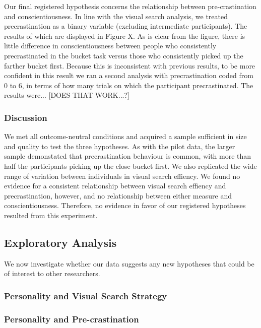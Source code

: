 \documentclass[]{rsos}
\begin{document}
Our final registered hypothesis concerns the relationship between pre-crastination and conscientiousness. In line with the visual search analysis, we treated precrastination as a binary variable (excluding intermediate participants). The results of which are displayed in Figure X. As is clear from the figure, there is little difference in conscientiousness between people who consistently precrastinated in the bucket task versus those who consistently picked up the farther bucket first. Because this is inconsistent with previous results, to be more confident in this result we ran a second analysis with precrastination coded from 0 to 6, in terms of how many trials on which the participant precrastinated. The results were...  [DOES THAT WORK...?]


\subsubsection{Discussion}

We met all outcome-neutral conditions and acquired a sample sufficient in size and quality to test the three hypotheses. As with the pilot data, the larger sample demonstated that precrastination behaviour is common, with more than half the participants picking up the close bucket first. We also replicated the wide range of variation between individuals in visual search effiency. We found no evidence for a consistent relationship between visual search effiency and precrastination, however, and no relationship between either measure and conscientiousness. Therefore, no evidence in favor of our registered hypotheses resulted from this experiment. 

\subsection{Exploratory Analysis}

We now investigate whether our data suggests any new hypotheses that could be of interest to other researchers.

\subsubsection{Personality and Visual Search Strategy}

\subsubsection{Personality and Pre-crastination}
\end{document}
